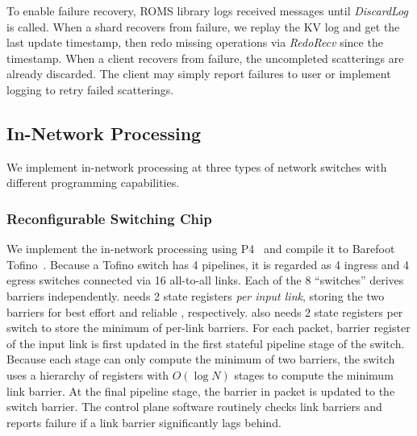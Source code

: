 To enable failure recovery, ROMS library logs received messages until \emph{DiscardLog} is called.
When a shard recovers from failure, we replay the KV log and get the last update timestamp, then redo missing operations via \emph{RedoRecv} since the timestamp.
When a client recovers from failure, the uncompleted scatterings are already discarded.
The client may simply report failures to user or implement logging to retry failed scatterings.
\fi


\subsection{In-Network Processing}
\label{sec:in-network-processing}

We implement in-network processing at three types of network switches with different programming capabilities.


\subsubsection{Reconfigurable Switching Chip}
\label{sec:p4}

We implement the in-network processing using P4~\cite{bosshart2014p4} and compile it to Barefoot Tofino~\cite{tofino}. Because a Tofino switch has 4 pipelines, it is regarded as 4 ingress and 4 egress switches connected via 16 all-to-all links. Each of the 8 ``switches'' derives barriers independently.
\sys{} needs 2 state registers \emph{per input link}, storing the two barriers for best effort and reliable \sys{}, respectively.
\sys{} also needs 2 state registers per switch to store the minimum of per-link barriers.
For each packet, barrier register of the input link is first updated in the first stateful pipeline stage of the switch.
Because each stage can only compute the minimum of two barriers, the switch uses a hierarchy of registers with $O(\log N)$ stages to compute the minimum link barrier.
At the final pipeline stage, the barrier in packet is updated to the switch barrier.
The control plane software routinely checks link barriers and reports failure if a link barrier significantly lags behind.


